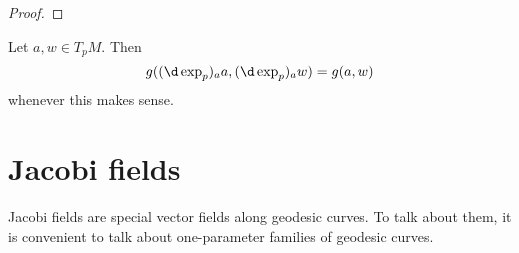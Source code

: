 \documentclass[a4paper]{article}
\begin{document}
\begin{proof}
%
%
%
%
\end{proof}

\begin{cor}
  Let $a, w \in T_p M$. Then
  \[
    g((\d \exp_p)_a a, (\d \exp_p)_a w) = g(a, w)
  \]
  whenever this makes sense.
\end{cor}

\section{Jacobi fields}
Jacobi fields are special vector fields along geodesic curves. To talk about them, it is convenient to talk about one-parameter families of geodesic curves.
\end{document}
